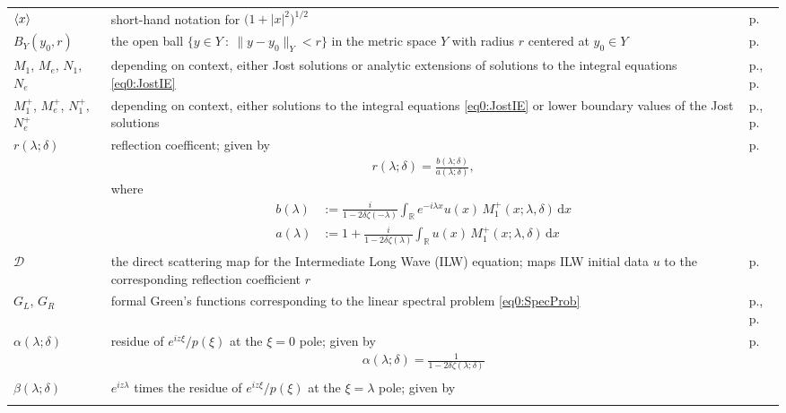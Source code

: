 \documentclass[../dissertation.tex]{subfiles}
\begin{document}
\begin{centering}
\begin{longtable}{R{.115\textwidth}|L{.74\textwidth}|C{.145\textwidth}}
	$\left\langle x \right\rangle$ & short-hand notation for $\big(1 + |x|^2\big)^{1/2}$
		& p.\pageref{sym:xbracket} \\
	$B_Y(y_0, r)$ & the open ball $\{ y \in Y ~:~ \|y - y_0\|_Y < r  \}$ in 
		the metric space $Y$ with radius $r$ centered at $y_0 \in Y$
		& p.\pageref{sym:ball} \\	
	$M_1$, $M_e$, $N_1$, $N_e$ & depending on context, either Jost solutions 
		or analytic extensions of solutions to the integral equations
		\eqref{eq0:JostIE}
		& p.\pageref{defn0:jost}, p.\pageref{eq0:JostIE} \\
	$M_1^+$, $M_e^+$, $N_1^+$, $N_e^+$ & depending on context, either solutions
		to the integral equations \eqref{eq0:JostIE} or lower boundary 
		values of the Jost solutions
		& p.\pageref{eq0:JostIE}, p.\pageref{defn0:jost} \\
	$r(\lambda; \delta)$ & reflection coefficent; given by
		{
			\begin{align*}
				r(\lambda; \delta) = \frac{b(\lambda; \delta)}{a(\lambda; \delta)},
			\end{align*}
			where
			\begin{align*}
				b(\lambda)
				&:= 
					\frac{i}{1-2\delta\zeta(-\lambda)} 
					\int_{\mathbb R} e^{-i\lambda x} 
						u(x) \, M_1^+(x; \lambda,\delta) 
					\, \mathrm{d}x
					\\
			a(\lambda)
				&:=
					1 
					+ \frac{i}{1-2\delta \zeta(\lambda)}
						\int_{\mathbb R} 
							u(x) \, M_1^+(x; \lambda,\delta) 
						\, \mathrm{d}x
			\end{align*}
		} 
		& p.\pageref{sym0:reflection} \\
	$\mathscr D$ & the direct scattering map for the Intermediate Long Wave (ILW) equation; maps
		ILW initial data $u$ to the corresponding reflection coefficient $r$
		& p.\pageref{sym0:DSM} \\
	$G_L$, $G_R$ & formal Green's functions corresponding to the linear spectral problem 
		\eqref{eq0:SpecProb}
		& p.\pageref{eq0:GFL},  p.\pageref{eq0:GFR}\\
	$\alpha(\lambda; \delta)$ & residue of $e^{iz\xi}/p(\xi)$ at the $\xi=0$
		pole; given by 
		{\begin{align*}
			\alpha(\lambda; \delta)
				= \frac{1}{1-2\delta\zeta(\lambda; \delta)}
		\end{align*}}
		& p.\pageref{sym0:residues} \\
	$\beta(\lambda; \delta)$ & $e^{iz\lambda}$ times the residue of 
		$e^{iz\xi}/p(\xi)$ at the $\xi=\lambda$ pole; given by 
		{\begin{align*}

\end{align*}}
\end{longtable}
\end{centering}
\end{document}
